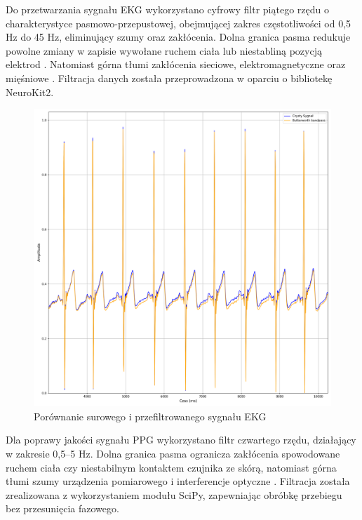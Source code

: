 \documentclass[journal]{IEEEtran}
\begin{document}
Do przetwarzania sygnału EKG wykorzystano cyfrowy filtr piątego rzędu o charakterystyce pasmowo-przepustowej, obejmującej zakres częstotliwości od 0,5 Hz do 45 Hz, eliminujący szumy oraz zakłócenia. Dolna granica pasma redukuje powolne zmiany w zapisie wywołane ruchem ciała lub niestabliną pozycją elektrod  \cite{10}. Natomiast górna tłumi zakłócenia sieciowe, elektromagnetyczne oraz mięśniowe  \cite{11}. Filtracja danych została przeprowadzona w oparciu o bibliotekę NeuroKit2.

\begin{figure}[htbp]
    \centering
    \includegraphics[width=0.76\linewidth]{Filtr_EKG.png} 
    \caption{Porównanie surowego i przefiltrowanego sygnału EKG}
    \label{fig:filtr_ekg}
\end{figure}

\newpage
Dla poprawy jakości sygnału PPG wykorzystano filtr  czwartego rzędu, działający w zakresie 0,5–5 Hz. Dolna granica pasma ogranicza zakłócenia spowodowane ruchem ciała czy niestabilnym kontaktem czujnika ze skórą, natomiast górna tłumi szumy urządzenia pomiarowego i interferencje optyczne  \cite{12}. Filtracja została zrealizowana z wykorzystaniem  modułu SciPy, zapewniając obróbkę przebiegu bez przesunięcia fazowego.
\end{document}

